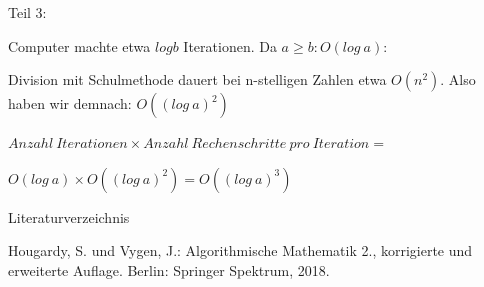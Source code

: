 \documentclass[10pt]{beamer}
\begin{document}
\begin{frame}

Teil 3: 
 \vspace{0.3cm}

Computer machte etwa $log b$ Iterationen. Da $ a \geq b : O(log \ a) $:

Division mit Schulmethode dauert bei n-stelligen Zahlen etwa $O(n^2)$.
\indent Also haben wir demnach: $O((log \ a)^2)$


\vspace{0.2cm}
$Anzahl \ Iterationen \times Anzahl \ Rechenschritte \ pro \ Iteration=$  

$O(log\ a) \times O((log \ a)^2) = O((log\ a)^3)$


    
\end{frame}

\begin{frame}{Literaturverzeichnis}

Hougardy, S. und  Vygen, J.: Algorithmische Mathematik 2., korrigierte und erweiterte Auflage. Berlin: Springer Spektrum, 2018.

    
\end{frame}
\end{document}
